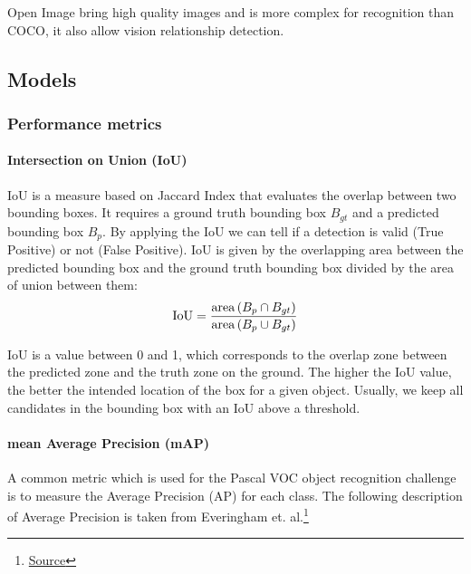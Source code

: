 Open Image bring high quality images and is more complex for recognition than COCO, it also allow vision relationship detection.


\pagebreak\subsection{Models}
\subsubsection{Performance metrics}
\paragraph{Intersection on Union (IoU)}
IoU is a measure based on Jaccard Index that evaluates the overlap between two bounding boxes. It requires a ground truth bounding box \begin{math}B_{gt}\end{math} and a predicted bounding box \begin{math}B_{p}\end{math}. 
By applying the IoU we can tell if a detection is valid (True Positive) or not (False Positive).
IoU is given by the overlapping area between the predicted bounding box and the ground truth bounding box divided by the area of union between them: 
\begin{gather*}
\centering
\mathrm{IoU}=\frac{\operatorname{area}\left(B_{p} \cap B_{g t}\right)}{\operatorname{area}\left(B_{p} \cup B_{g t}\right)}
\end{gather*}

IoU is a value between 0 and 1, which corresponds to the overlap zone between the predicted zone and the truth zone on the ground. The higher the IoU value, the better the intended location of the box for a given object. Usually, we keep all candidates in the bounding box with an IoU above a threshold.

\pagebreak\paragraph{mean Average Precision (mAP)}

A common metric which is used for the Pascal VOC object recognition challenge is to measure the Average Precision (AP) for each class. The following description of Average Precision is taken from Everingham et. al.\footnote{\href{http://homepages.inf.ed.ac.uk/ckiw/postscript/ijcv_voc09.pdf}{Source}}

